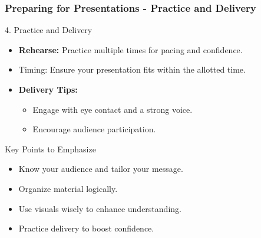 \documentclass[aspectratio=169]{beamer}
\begin{document}
\begin{frame}[fragile]
    \frametitle{Preparing for Presentations - Practice and Delivery}
    \begin{block}{4. Practice and Delivery}
        \begin{itemize}
            \item \textbf{Rehearse:} Practice multiple times for pacing and confidence.
            \item Timing: Ensure your presentation fits within the allotted time.
            \item \textbf{Delivery Tips:}
                \begin{itemize}
                    \item Engage with eye contact and a strong voice.
                    \item Encourage audience participation.
                \end{itemize}
        \end{itemize}
    \end{block}

    \begin{block}{Key Points to Emphasize}
        \begin{itemize}
            \item Know your audience and tailor your message.
            \item Organize material logically.
            \item Use visuals wisely to enhance understanding.
            \item Practice delivery to boost confidence.
        \end{itemize}
    \end{block}
\end{frame}
\end{document}
